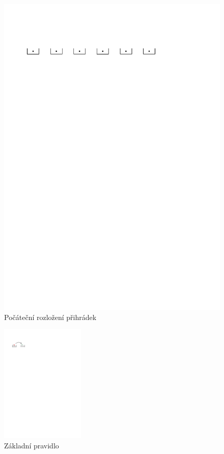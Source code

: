 \documentclass[10pt]{article}
\theoremstyle{definitionstyle}
\theoremstyle{problemstyle}
\begin{document}
\begin{figure}[h]
    \centering
    \includegraphics[width=12cm]{hazard_setup.pdf}
    \caption{Počáteční rozložení přihrádek}
\end{figure}

\vspace{1cm}

\begin{figure}[h]
    \centering
    \includegraphics[width=4cm]{hazard_rule_1.pdf}
    \caption{Základní pravidlo}
\end{figure}
\end{document}
